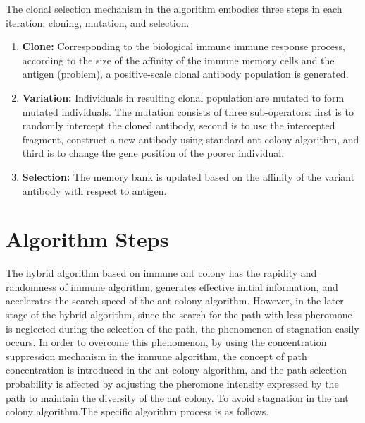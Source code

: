 \documentclass[11pt,a4paper,oldfontcommands]{memoir}
\begin{document}
The clonal selection mechanism in the algorithm embodies three steps in each iteration: cloning, mutation, and selection.
\begin{enumerate}
\item{ \textbf{Clone:} Corresponding to the biological immune immune response process, according to the size of the affinity of the immune memory cells and the antigen (problem), a positive-scale clonal antibody population is generated.}
\item{\textbf{Variation:} Individuals in resulting clonal population are mutated to form mutated individuals. The mutation consists of three sub-operators: first is to randomly intercept the cloned antibody,  second is to use the intercepted fragment, construct a new antibody using standard ant colony algorithm, and third is to change the gene position of the poorer individual.}
\item{\textbf{Selection:} The memory bank is updated based on the affinity of the variant antibody with respect to antigen.}
\end{enumerate}

\section{Algorithm Steps}
The hybrid algorithm based on immune ant colony has the rapidity and randomness of immune algorithm, generates effective initial information, and accelerates the search speed of the ant colony algorithm. However, in the later stage of the hybrid algorithm, since the search for the path with less pheromone is neglected during the selection of the path, the phenomenon of stagnation easily occurs. In order to overcome this phenomenon, by using the concentration suppression mechanism in the immune algorithm, the concept of path concentration is introduced in the ant colony algorithm, and the path selection probability is affected by adjusting the pheromone intensity expressed by the path to maintain the diversity of the ant colony. To avoid stagnation in the ant colony algorithm.The specific algorithm process is as follows.
\end{document}
